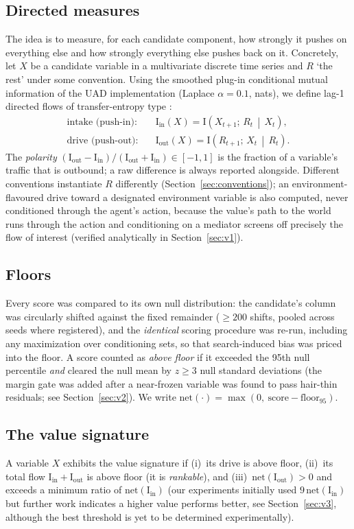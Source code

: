 \documentclass[11pt]{article}
\newcommand{\I}{\mathrm{I}}
\newcommand{\net}{\mathrm{net}}
\newcommand{\vin}{\mathrm{in}}
\newcommand{\vout}{\mathrm{out}}
\begin{document}
\subsection{Directed measures}
The idea is to measure, for each candidate component, how strongly it pushes on
everything else and how strongly everything else pushes back on it. Concretely, let
$X$ be a candidate variable in a multivariate discrete time series and $R$ `the
rest' under some convention. Using the smoothed plug-in conditional mutual information
of the UAD implementation (Laplace $\alpha=0.1$, nats), we define lag-1 directed flows
of transfer-entropy type \citep{schreiber2000te}:
\begin{align}
\text{intake (push-in):}\quad & \I_\vin(X)  = \I\!\left(X_{t+1};\, R_t \,\middle|\, X_t\right),\\
\text{drive (push-out):}\quad & \I_\vout(X) = \I\!\left(R_{t+1};\, X_t \,\middle|\, R_t\right).
\end{align}
The \emph{polarity} $(\I_\vout-\I_\vin)/(\I_\vout+\I_\vin)\in[-1,1]$ is the fraction of a
variable's traffic that is outbound; a raw difference is always reported alongside.
Different conventions instantiate $R$ differently (Section~\ref{sec:conventions}); an
environment-flavoured drive toward a designated environment variable is also computed,
never conditioned through the agent's action, because the value's path to the world runs
through the action and conditioning on a mediator screens off precisely the flow of
interest (verified analytically in Section~\ref{sec:v1}).

\subsection{Floors}
Every score was compared to its own null distribution: the candidate's column was
circularly shifted against the fixed remainder ($\geq 200$ shifts, pooled across seeds
where registered), and the \emph{identical} scoring procedure was re-run, including any
maximization over conditioning sets, so that search-induced bias was priced into the
floor. A score counted as \emph{above floor} if it exceeded the 95th null percentile
\emph{and} cleared the null mean by $z\geq 3$ null standard deviations (the margin gate
was added after a near-frozen variable was found to pass hair-thin residuals; see
Section~\ref{sec:v2}). We write $\net(\cdot)=\max(0,\ \text{score}-\text{floor}_{95})$.

\subsection{The value signature}
A variable $X$ exhibits the value signature if (i)~its drive is above floor,
(ii)~its total flow $\I_\vin+\I_\vout$ is above floor (it is \emph{rankable}), and
(iii)~$\net(\I_\vout)>0$ and exceeds a minimum ratio of $\net(\I_\vin)$ (our
experiments initially used $9\,\net(\I_\vin)$ but further work indicates a higher
value performs better, see Section~\ref{sec:v3}, although the best threshold is yet
to be determined experimentally).
\end{document}

